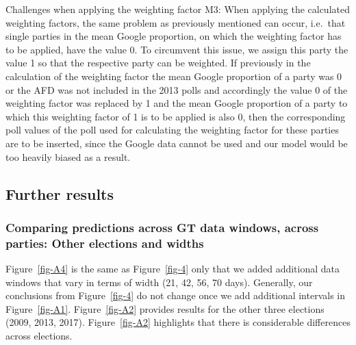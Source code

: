 \documentclass[
  letterpaper,
  DIV=11,
  numbers=noendperiod]{scrartcl}
\begin{document}
Challenges when applying the weighting factor M3: When applying the
calculated weighting factors, the same problem as previously mentioned
can occur, i.e.~that single parties in the mean Google proportion, on
which the weighting factor has to be applied, have the value 0. To
circumvent this issue, we assign this party the value 1 so that the
respective party can be weighted. If previously in the calculation of
the weighting factor the mean Google proportion of a party was 0 or the
AFD was not included in the 2013 polls and accordingly the value 0 of
the weighting factor was replaced by 1 and the mean Google proportion of
a party to which this weighting factor of 1 is to be applied is also 0,
then the corresponding poll values of the poll used for calculating the
weighting factor for these parties are to be inserted, since the Google
data cannot be used and our model would be too heavily biased as a
result.

\hypertarget{further-results}{%
\subsection{Further results}\label{further-results}}

\hypertarget{comparing-predictions-across-gt-data-windows-across-parties-other-elections-and-widths}{%
\subsubsection{Comparing predictions across GT data windows, across
parties: Other elections and
widths}\label{comparing-predictions-across-gt-data-windows-across-parties-other-elections-and-widths}}

Figure~\ref{fig-A4} is the same as Figure~\ref{fig-4} only that we added
additional data windows that vary in terms of width (21, 42, 56, 70
days). Generally, our conclusions from Figure~\ref{fig-4} do not change
once we add additional intervals in Figure~\ref{fig-A1}.
Figure~\ref{fig-A2} provides results for the other three elections
(2009, 2013, 2017). Figure~\ref{fig-A2} highlights that there is
considerable differences across elections.
\end{document}
